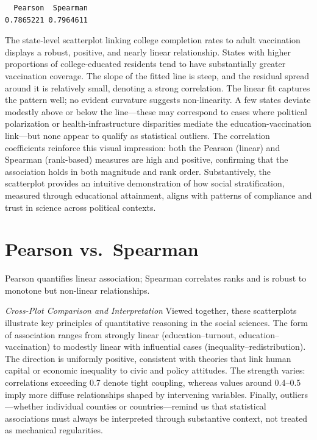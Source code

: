 \documentclass[
  letterpaper,
  DIV=11,
  numbers=noendperiod]{scrreprt}
\begin{document}
\begin{verbatim}
  Pearson  Spearman 
0.7865221 0.7964611 
\end{verbatim}

The state-level scatterplot linking college completion rates to adult
vaccination displays a robust, positive, and nearly linear relationship.
States with higher proportions of college-educated residents tend to
have substantially greater vaccination coverage. The slope of the fitted
line is steep, and the residual spread around it is relatively small,
denoting a strong correlation. The linear fit captures the pattern well;
no evident curvature suggests non-linearity. A few states deviate
modestly above or below the line---these may correspond to cases where
political polarization or health-infrastructure disparities mediate the
education-vaccination link---but none appear to qualify as statistical
outliers. The correlation coefficients reinforce this visual impression:
both the Pearson (linear) and Spearman (rank-based) measures are high
and positive, confirming that the association holds in both magnitude
and rank order. Substantively, the scatterplot provides an intuitive
demonstration of how social stratification, measured through educational
attainment, aligns with patterns of compliance and trust in science
across political contexts.

\section{Pearson vs.~Spearman}\label{pearson-vs.-spearman}

Pearson quantifies linear association; Spearman correlates ranks and is
robust to monotone but non-linear relationships.

\emph{Cross-Plot Comparison and Interpretation} Viewed together, these
scatterplots illustrate key principles of quantitative reasoning in the
social sciences. The form of association ranges from strongly linear
(education--turnout, education--vaccination) to modestly linear with
influential cases (inequality--redistribution). The direction is
uniformly positive, consistent with theories that link human capital or
economic inequality to civic and policy attitudes. The strength varies:
correlations exceeding 0.7 denote tight coupling, whereas values around
0.4--0.5 imply more diffuse relationships shaped by intervening
variables. Finally, outliers---whether individual counties or
countries---remind us that statistical associations must always be
interpreted through substantive context, not treated as mechanical
regularities.
\end{document}
